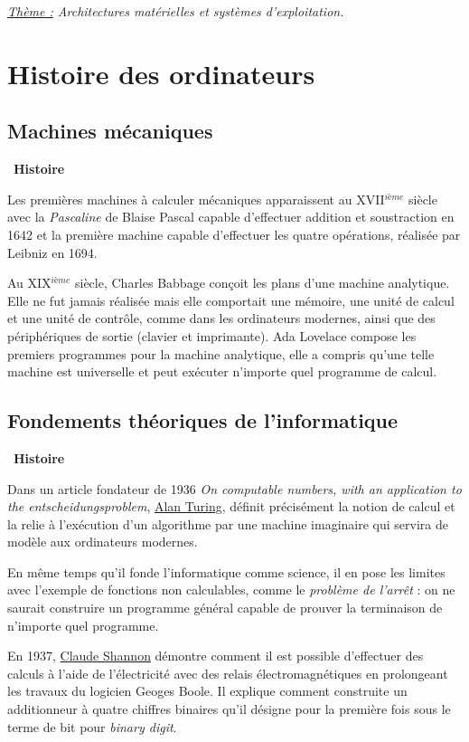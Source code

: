 \documentclass[a4paper, french, 11pt]{article}  %
\newcounter{thme}
\newcounter{alg}
\newcounter{prog}
\newcounter{histo}
\newenvironment{histoire}[1]
{\par \medskip   \addtocounter{histo}{1} \noindent  
 \begin {bclogo}[couleur = blue!10 , arrondi =0.1,logo=\bchorloge, marge=4] {~\textbf{Histoire} \textbf{\thehisto} {\itshape #1} }  \par}
{
\end{bclogo}
 \par \bigskip }
\begin{document}
\setlength{\parindent}{0cm}

{\itshape \uline{Thème :} Architectures matérielles et systèmes d'exploitation. }

\section{Histoire des ordinateurs}





\subsection{Machines mécaniques}

\begin{histoire}{}
Les premières machines à calculer mécaniques apparaissent au XVII$^{ième}$ siècle avec la \textit{Pascaline} de Blaise Pascal capable d'effectuer addition et soustraction en 1642 et la première machine capable d'effectuer les quatre opérations, réalisée par  Leibniz en 1694.

Au XIX$^{ième}$ siècle, Charles Babbage conçoit les plans d'une machine analytique. Elle ne fut jamais réalisée mais elle comportait une mémoire, une unité de calcul et une unité de contrôle, comme dans les ordinateurs modernes, ainsi que des périphériques de sortie (clavier et imprimante). Ada Lovelace compose les premiers programmes pour la machine analytique, elle a compris qu'une telle machine est universelle et peut exécuter n'importe quel programme de calcul.

\end{histoire}


\subsection{Fondements théoriques de l'informatique}

\begin{histoire}{}


Dans un article fondateur de 1936 \textit{On computable numbers, with an application to the entscheidungsproblem}, \href{https://interstices.info/alan-turingproblème de l'arrêt-du-calculable-a-lindecidable/}{Alan Turing}, définit précisément la notion de calcul et la relie à l'exécution d'un algorithme par une machine imaginaire qui servira de modèle aux ordinateurs modernes. 

En même temps qu'il fonde l'informatique comme science, il  en pose les limites avec l'exemple de fonctions non calculables, comme le \textit{problème de l'arrêt} : on ne saurait construire un programme général capable de prouver la terminaison de n'importe quel programme.

En 1937, \href{https://fr.wikipedia.org/wiki/Claude_Shannon}{Claude Shannon} démontre comment il est possible d'effectuer des calculs à l'aide de l'électricité avec des relais électromagnétiques en prolongeant les travaux du logicien Geoges Boole.  Il explique comment construite un additionneur à quatre chiffres binaires qu'il désigne pour la première fois sous  le terme de bit pour  \textit{binary digit}.

\end{histoire}
\end{document}
